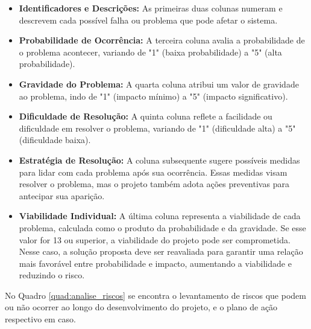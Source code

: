 \begin{itemize}
   \item \textbf{Identificadores e Descrições:} As primeiras duas colunas numeram e descrevem cada possível falha ou problema que pode afetar o sistema.
   \item \textbf{Probabilidade de Ocorrência:} A terceira coluna avalia a probabilidade de o problema acontecer, variando de "1" (baixa probabilidade) a "5" (alta probabilidade).
   \item \textbf{Gravidade do Problema:} A quarta coluna atribui um valor de gravidade ao problema, indo de "1" (impacto mínimo) a "5" (impacto significativo).
   \item \textbf{Dificuldade de Resolução:} A quinta coluna reflete a facilidade ou dificuldade em resolver o problema, variando de "1" (dificuldade alta) a "5" (dificuldade baixa).
   \item \textbf{Estratégia de Resolução:} A coluna subsequente sugere possíveis medidas para lidar com cada problema após sua ocorrência. Essas medidas visam resolver o problema, mas o projeto também adota ações preventivas para antecipar sua aparição.
   \item \textbf{Viabilidade Individual:} A última coluna representa a viabilidade de cada problema, calculada como o produto da probabilidade e da gravidade. Se esse valor for 13 ou superior, a viabilidade do projeto pode ser comprometida. Nesse caso, a solução proposta deve ser reavaliada para garantir uma relação mais favorável entre probabilidade e impacto, aumentando a viabilidade e reduzindo o risco.
   
\end{itemize}

No Quadro \ref*{quad:analise_riscos} se encontra o levantamento de riscos que podem ou não ocorrer ao longo do desenvolvimento do projeto, e o plano de ação respectivo em caso. 

